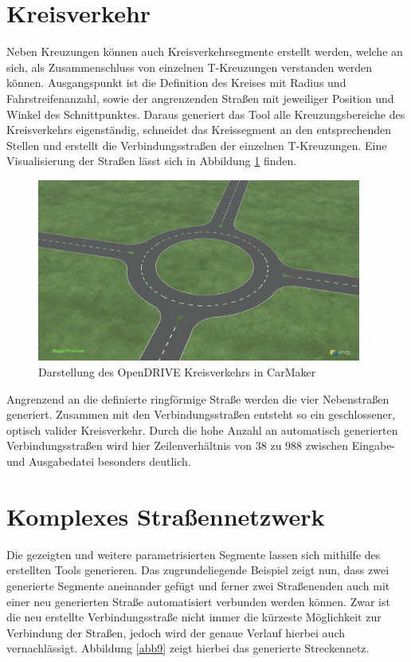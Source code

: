 \section{Kreisverkehr}
Neben Kreuzungen können auch Kreisverkehrsegmente erstellt werden, welche an sich, als Zusammenschluss von einzelnen T-Kreuzungen verstanden werden können. Ausgangspunkt ist die Definition des Kreises mit Radius und Fahrstreifenanzahl, sowie der angrenzenden Straßen mit jeweiliger Position und Winkel des Schnittpunktes. Daraus generiert das Tool alle Kreuzungsbereiche des Kreisverkehrs eigenständig, schneidet das Kreissegment an den entsprechenden Stellen und erstellt die Verbindungsstraßen der einzelnen T-Kreuzungen. Eine Visualisierung der Straßen lässt sich in Abbildung \ref{abb8} finden.

\begin{figure}[H]
\flushleft
\includegraphics[width=0.95\textwidth]{fig/roundabout.png}
\caption{Darstellung des OpenDRIVE Kreisverkehrs in CarMaker}
\label{abb8}
\end{figure}

Angrenzend an die definierte ringförmige Straße werden die vier Nebenstraßen generiert. Zusammen mit den Verbindungsstraßen entsteht so ein geschlossener, optisch valider Kreisverkehr. Durch die hohe Anzahl an automatisch generierten Verbindungsstraßen wird hier Zeilenverhältnis von \(38\) zu \(988\) zwischen Eingabe- und Ausgabedatei besonders deutlich.

\section{Komplexes Straßennetzwerk}

Die gezeigten und weitere parametrisierten Segmente lassen sich mithilfe des erstellten Tools generieren. Das zugrundeliegende Beispiel zeigt nun, dass zwei generierte Segmente aneinander gefügt und ferner zwei Straßenenden auch mit einer neu generierten Straße automatisiert verbunden werden können. Zwar ist die neu erstellte Verbindungsstraße nicht immer die kürzeste Möglichkeit zur Verbindung der Straßen, jedoch wird der genaue Verlauf hierbei auch vernachlässigt. Abbildung \ref{abb9} zeigt hierbei das generierte Streckennetz.


